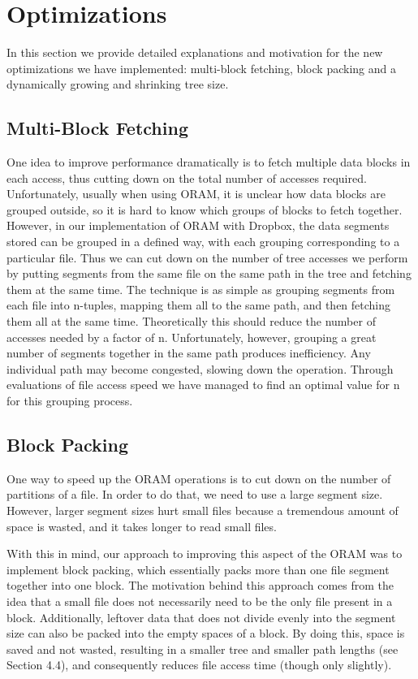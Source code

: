 \documentclass[conference]{IEEEtran}
\begin{document}
\section{Optimizations}

In this section we provide detailed explanations and motivation for the new optimizations we have implemented: multi-block fetching, block packing and a dynamically growing and shrinking tree size.

\subsection{Multi-Block Fetching}

One idea to improve performance dramatically is to fetch multiple data blocks in each access, thus cutting down on the total number of accesses required. Unfortunately, usually when using ORAM, it is unclear how data blocks are grouped outside, so it is hard to know which groups of blocks to fetch together. However, in our implementation of ORAM with Dropbox, the data segments stored can be grouped in a defined way, with each grouping corresponding to a particular file. Thus we can cut down on the number of tree accesses we perform by putting segments from the same file on the same path in the tree and fetching them at the same time. The technique is as simple as grouping segments from each file into n-tuples, mapping them all to the same path, and then fetching them all at the same time. Theoretically this should reduce the number of accesses needed by a factor of n. Unfortunately, however, grouping a great number of segments together in the same path produces inefficiency. Any individual path may become congested, slowing down the operation. Through evaluations of file access speed we have managed to find an optimal value for n for this grouping process.

\subsection{Block Packing}

One way to speed up the ORAM operations is to cut down on the number of partitions of a file. In order to do that, we need to use a large segment size. However, larger segment sizes hurt small files because a tremendous amount of space is wasted, and it takes longer to read small files. 

With this in mind, our approach to improving this aspect of the ORAM was to implement block packing, which essentially packs more than one file segment together into one block. The motivation behind this approach comes from the idea that a small file does not necessarily need to be the only file present in a block. Additionally, leftover data that does not divide evenly into the segment size can also be packed into the empty spaces of a block. By doing this, space is saved and not wasted, resulting in a smaller tree and smaller path lengths (see Section 4.4), and consequently reduces file access time (though only slightly).
\end{document}
